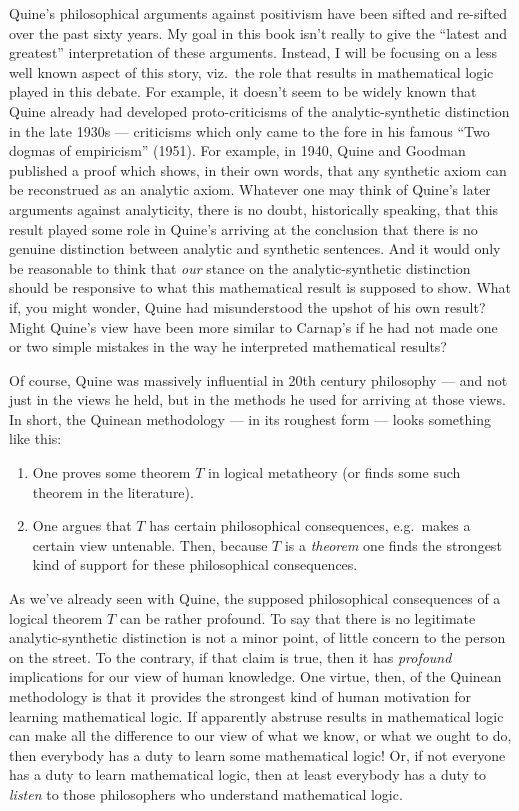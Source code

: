 Quine's philosophical arguments against positivism have been sifted
and re-sifted over the past sixty years.  My goal in this book isn't
really to give the ``latest and greatest'' interpretation of these
arguments.  Instead, I will be focusing on a less well known aspect of
this story, viz.\ the role that results in mathematical logic played
in this debate.  For example, it doesn't seem to be widely known that
Quine already had developed proto-criticisms of the analytic-synthetic
distinction in the late 1930s --- criticisms which only came to the
fore in his famous ``Two dogmas of empiricism'' (1951).  For example,
in 1940, Quine and Goodman published a proof which shows, in their own
words, that any synthetic axiom can be reconstrued as an analytic
axiom.  Whatever one may think of Quine's later arguments against
analyticity, there is no doubt, historically speaking, that this
result played some role in Quine's arriving at the conclusion that
there is no genuine distinction between analytic and synthetic
sentences.  And it would only be reasonable to think that {\it our}
stance on the analytic-synthetic distinction should be responsive to
what this mathematical result is supposed to show.  What if, you might
wonder, Quine had misunderstood the upshot of his own result?  Might
Quine's view have been more similar to Carnap's if he had not made one
or two simple mistakes in the way he interpreted mathematical results?

Of course, Quine was massively influential in 20th century philosophy
--- and not just in the views he held, but in the methods he used for
arriving at those views.  In short, the Quinean methodology --- in its
roughest form --- looks something like this:
\begin{enumerate}
\item One proves some theorem $T$ in logical metatheory (or finds some
  such theorem in the literature).
\item One argues that $T$ has certain philosophical consequences,
  e.g.\ makes a certain view untenable.  Then, because $T$ is a {\it
    theorem} one finds the strongest kind of support for these
  philosophical consequences.
\end{enumerate}
As we've already seen with Quine, the supposed philosophical
consequences of a logical theorem $T$ can be rather profound.  To say
that there is no legitimate analytic-synthetic distinction is not a
minor point, of little concern to the person on the street.  To the
contrary, if that claim is true, then it has {\it profound}
implications for our view of human knowledge.  One virtue, then, of
the Quinean methodology is that it provides the strongest kind of
human motivation for learning mathematical logic.  If apparently
abstruse results in mathematical logic can make all the difference to
our view of what we know, or what we ought to do, then everybody has a
duty to learn some mathematical logic!  Or, if not everyone has a duty
to learn mathematical logic, then at least everybody has a duty to
{\it listen} to those philosophers who understand mathematical logic.

